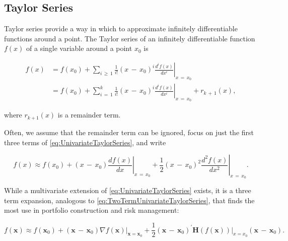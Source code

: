 \documentclass[graybox,envcountchap,sectrefs]{svmono}\usepackage[]{graphicx}\usepackage[]{xcolor}
\begin{document}
\begin{appendices}
\subsection{Taylor Series}

Taylor series provide a way in which to approximate infinitely differentiable
functions around a point. The Taylor series of an infinitely differentiable
function $f(x)$ of a single variable around a point $x_{0}$ is

\begin{align}
f\left(x\right) & =f\left(x_{0}\right)+\sum_{i\,\geqslant\,1}\left.\frac{1}{i!}\left(x\,-\,x_{0}\right)^{i}\frac{d^{i}f\left(x\right)}{dx^{i}}\right|_{x\,=\,x_{0}}\nonumber \\
 & =f\left(x_{0}\right)+\sum_{i\,=\,1}^{k}\left.\frac{1}{i!}\left(x\,-\,x_{0}\right)^{i}\frac{d^{i}f\left(x\right)}{dx^{i}}\right|_{x\,=\,x_{0}}+r_{k\,+\,1}(x),\label{eq:UnivariateTaylorSeries}
\end{align}

where $r_{k+1}(x)$ is a remainder term. 

Often, we assume that the remainder term can be ignored, focus on
just the first three terms of \eqref{eq:UnivariateTaylorSeries},
and write

\begin{equation}
f\left(x\right)\approx f\left(x_{0}\right)+\left(x\,-\,x_{0}\right)\left.\frac{df\left(x\right)}{dx}\right|_{x\,=\,x_{0}}+\frac{1}{2}\left(x\,-\,x_{0}\right)^{2}\left.\frac{d^{2}f\left(x\right)}{dx^{2}}\right|_{x\,=\,x_{0}}.\label{eq:TwoTermUnivariateTaylorSeries}
\end{equation}

While a multivariate extension of \eqref{eq:UnivariateTaylorSeries}
exists, it is a three term expansion, analogous to \eqref{eq:TwoTermUnivariateTaylorSeries},
that finds the most use in portfolio construction and risk management:

\begin{equation}
f\left(\mathrm{\mathbf{x}}\right)\approx f\left(\mathrm{\mathbf{x}}_{0}\right)+\left(\mathrm{\mathbf{x}}\,-\,\mathrm{\mathbf{x}}_{0}\right)\left.\nabla f\left(\mathrm{\mathbf{x}}\right)\right|_{\mathrm{\mathbf{x}}=\mathrm{\mathbf{x}}_{0}}+\frac{1}{2}\left(\mathrm{\mathbf{x}}\,-\,\mathrm{\mathbf{x}}_{0}\right)^{\prime}\left.\mathrm{\mathbf{H}}\left(f\left(\mathrm{\mathbf{x}}\right)\right)\right|_{x=x_{0}}\left(\mathrm{\mathbf{x}}\,-\,\mathrm{\mathbf{x}}_{0}\right).\label{eq:TwoTermMultivariateTaylorSeries}
\end{equation}


\end{appendices}
\end{document}
